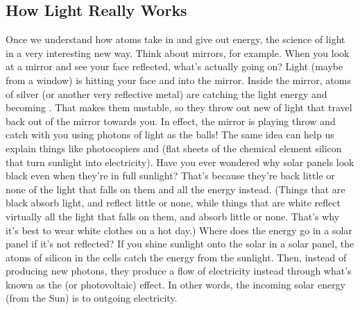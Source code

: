 \subsection*{How Light Really Works}
Once we understand how atoms take in and give out energy, the science of light \underline{\hspace{1.1cm}}
in a very interesting new way. Think about mirrors, for example. When you look at a mirror and see
your face reflected, what's actually going on? Light (maybe from a window) is hitting your face and
\underline{\hspace{2cm}} into the mirror. Inside the mirror, atoms of silver (or another very reflective
metal) are catching the \underline{\hspace{2cm}} light energy and becoming \underline{\hspace{2cm}}. That makes
them unstable, so they throw out new \underline{\hspace{2cm}} of light that travel back out of the mirror
towards you. In effect, the mirror is playing throw and catch with you using photons of light as the
balls!
The same idea can help us explain things like photocopiers and \underline{\hspace{2cm}} (flat sheets of the
chemical element silicon that turn sunlight into electricity). Have you ever wondered why solar
panels look black even when they're in full sunlight? That's because they're \underline{\hspace{2cm}} back
little or none of the light that falls on them and \underline{\hspace{2cm}} all the energy instead. (Things that
are black absorb light, and reflect little or none, while things that are white reflect virtually all the
light that falls on them, and absorb little or none. That's why it's best to wear white clothes on a hot
day.) Where does the energy go in a solar panel if it's not reflected? If you shine sunlight onto the
solar \underline{\hspace{2cm}} in a solar panel, the atoms of silicon in the cells catch the energy from the
sunlight. Then, instead of producing new photons, they produce a flow of electricity instead through
what's known as the \underline{\hspace{2cm}} (or photovoltaic) effect. In other words, the incoming solar
energy (from the Sun) is \underline{\hspace{2cm}} to outgoing electricity.

